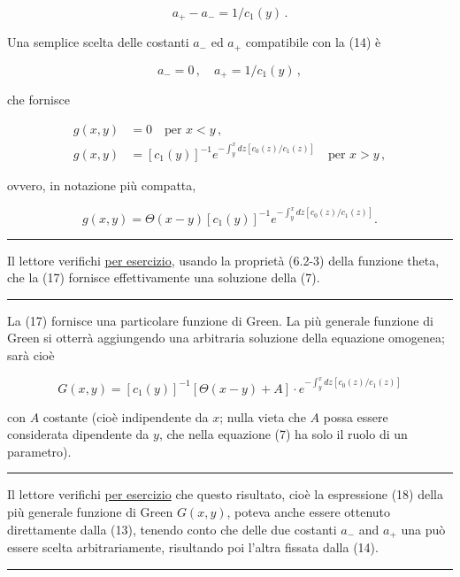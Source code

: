 \documentclass[11pt, a4paper]{book}
\numberwithin{equation}{section}
\begin{document}
\begin{equation}
    a_+ - a_- = 1/c_1(y) \,.
\end{equation}

Una semplice scelta delle costanti $a_-$ ed $a_+$ compatibile con la (14) è

\begin{equation}
    a_- = 0 \,, \quad a_+ = 1/c_1(y) \,,
\end{equation}

che fornisce

\begin{align}
    g(x,y) &= 0 \quad \text{per } x < y \,, \tag{16a} \\
    g(x,y) &= \left[ c_1(y) \right]^{-1} e^{\displaystyle -\int_{y}^{x} dz \left[ c_0(z)/c_1(z) \right]} \quad \text{per } x > y \,, \tag{16b}
\end{align}

ovvero, in notazione più compatta,

\begin{equation}
    g(x,y) = \Theta(x-y) \left[ c_1(y) \right]^{-1} e^{\displaystyle -\int_{y}^{x} dz \left[ c_0(z)/c_1(z) \right]}.
\end{equation}

\medskip
\noindent\rule{\textwidth}{0.4pt}
Il lettore verifichi \underline{per esercizio}, usando la proprietà (6.2-3) della funzione theta, che la (17) fornisce effettivamente una soluzione della (7).
\noindent\rule{\textwidth}{0.4pt}
\medskip

La (17) fornisce una particolare funzione di Green. La più generale funzione di Green si otterrà aggiungendo una arbitraria soluzione della equazione omogenea; sarà cioè

\begin{equation}
    G(x,y) = \left[ c_1(y) \right]^{-1} \left[ \Theta(x-y) + A \right]
    \cdot e^{\displaystyle -\int_{y}^{x} dz \left[ c_0(z)/c_1(z) \right]}
\end{equation}

con $A$ costante (cioè indipendente da $x$; nulla vieta che $A$ possa essere considerata dipendente da $y$, che nella equazione (7) ha solo il ruolo di un parametro).

\medskip
\noindent\rule{\textwidth}{0.4pt}
Il lettore verifichi \underline{per esercizio} che questo risultato, cioè la espressione (18) della più generale funzione di Green $G(x,y)$, poteva anche essere ottenuto direttamente dalla (13), tenendo conto che delle due costanti $a_-$ and $a_+$ una può essere scelta arbitrariamente, risultando poi l'altra fissata dalla (14).
\noindent\rule{\textwidth}{0.4pt}
\medskip
\end{document}
